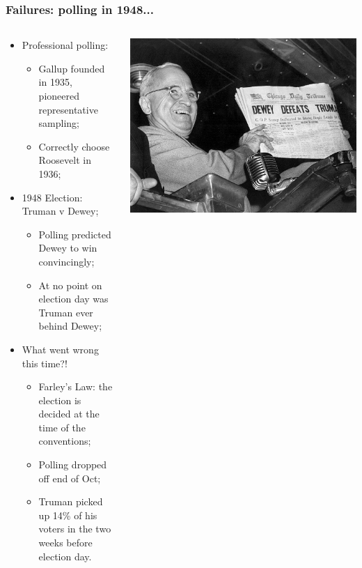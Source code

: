 \documentclass[aspectratio=169]{beamer}
\theoremstyle{principle}
\begin{document}
\begin{frame}
\frametitle{Failures: polling in 1948...}

\begin{columns}
\begin{column}{0.5\textwidth}


\begin{itemize}
\item Professional polling:
\begin{itemize}
\item Gallup founded in 1935, pioneered representative sampling;
\item Correctly choose Roosevelt in 1936;
\end{itemize}

\item 1948 Election: Truman v Dewey;
\begin{itemize}
\item Polling predicted Dewey to win convincingly;
\item At no point on election day was Truman ever behind Dewey;
\end{itemize}

\item What went wrong this time?!
\begin{itemize}
\item Farley's Law: the election is decided at the time of the conventions;
\item Polling dropped off end of Oct;
\item Truman picked up 14\% of his voters in the two weeks before election day.
\end{itemize}
\end{itemize}

\end{column}
\begin{column}{0.5\textwidth}
\begin{center}
\includegraphics[scale=0.1]{Dewey_Defeats_Truman.jpg}
\end{center}
\end{column}
\end{columns}

\end{frame}
\end{document}
